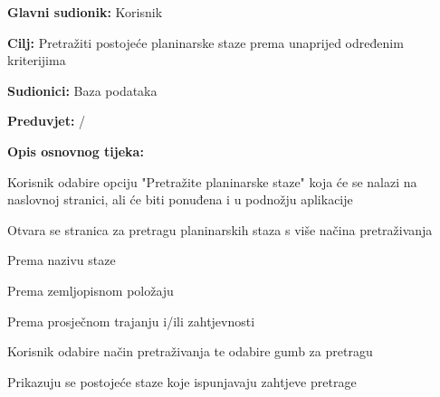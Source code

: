 			\noindent {}
		\begin{packed_item}
			
			\item \textbf{Glavni sudionik: }$ $Korisnik$ $
			\item  \textbf{Cilj:} $ $Pretražiti postojeće planinarske staze prema unaprijed određenim kriterijima $ $
			\item  \textbf{Sudionici:} $ $Baza podataka$ $
			\item  \textbf{Preduvjet:} $ $/$ $
			\item  \textbf{Opis osnovnog tijeka:}
			
			\item[] \begin{packed_enum}
				
				\item $ $Korisnik odabire opciju "Pretražite planinarske staze" koja će se nalazi na naslovnoj stranici, ali će biti ponuđena i u podnožju aplikacije$ $
				\item $ $Otvara se stranica za pretragu planinarskih staza s više načina pretraživanja$ $
					\begin{packed_enum}
						\item Prema nazivu staze
						\item Prema zemljopisnom položaju
						\item Prema prosječnom trajanju i/ili zahtjevnosti
					\end{packed_enum}
				\item $ $Korisnik odabire način pretraživanja te odabire gumb za pretragu$ $
				\item $ $Prikazuju se postojeće staze koje ispunjavaju zahtjeve pretrage$ $
				
			\end{packed_enum}
		\end{packed_item}
		
